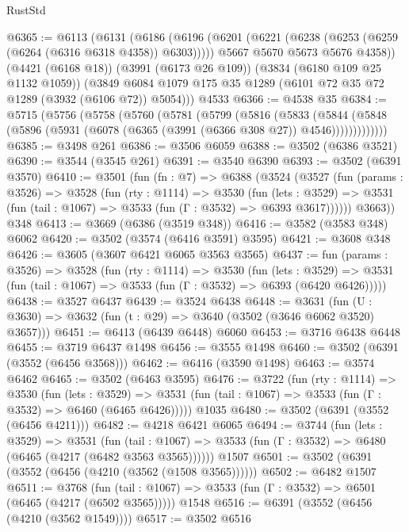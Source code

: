 \begin{lexlean}{RustStd}
\begin{coremodule}
@6365 := @6113
    (@6131
      (@6186
        (@6196
          (@6201 (@6221 (@6238 (@6253 (@6259 (@6264 (@6316 @6318 @4358)) @6303)))))
          @5667
          @5670
          @5673
          @5676
          @4358))
      (@4421 (@6168 @18))
      (@3991 (@6173 @26 @109))
      (@3834 (@6180 @109 @25 @1132 @1059))
      (@3849 @6084 @1079 @175 @35 @1289 (@6101 @72 @35 @72 @1289 (@3932 (@6106 @72)) @5054)))
    @4533
@6366 := @4538 @35
@6384 := @5715
    (@5756
      (@5758
        (@5760
          (@5781
            (@5799
              (@5816
                (@5833
                  (@5844
                    (@5848 (@5896 (@5931 (@6078 (@6365 (@3991 (@6366 @308 @27)) @4546)))))))))))))
@6385 := @3498 @261
@6386 := @3506 @6059
@6388 := @3502 (@6386 @3521)
@6390 := @3544 (@3545 @261)
@6391 := @3540 @6390
@6393 := @3502 (@6391 @3570)
@6410 := @3501
    (fun (fn : @7) =>
    @6388
      (@3524
        (@3527
          (fun (params : @3526) =>
          @3528
            (fun (rty : @1114) =>
            @3530
              (fun (lets : @3529) =>
              @3531 (fun (tail : @1067) => @3533 (fun (Γ : @3532) => @6393 @3617))))))
        @3663))
    @348
@6413 := @3669 (@6386 (@3519 @348))
@6416 := @3582 (@3583 @348) @6062
@6420 := @3502 (@3574 (@6416 @3591) @3595)
@6421 := @3608 @348
@6426 := @3605 (@3607 @6421 @6065 @3563 @3565)
@6437 := fun (params : @3526) =>
  @3528
    (fun (rty : @1114) =>
    @3530
      (fun (lets : @3529) =>
      @3531 (fun (tail : @1067) => @3533 (fun (Γ : @3532) => @6393 (@6420 @6426)))))
@6438 := @3527 @6437
@6439 := @3524 @6438
@6448 := @3631 (fun (U : @3630) => @3632 (fun (t : @29) => @3640 (@3502 (@3646 @6062 @3520) @3657)))
@6451 := @6413 (@6439 @6448) @6060
@6453 := @3716 @6438 @6448
@6455 := @3719 @6437 @1498
@6456 := @3555 @1498
@6460 := @3502 (@6391 (@3552 (@6456 @3568)))
@6462 := @6416 (@3590 @1498)
@6463 := @3574 @6462
@6465 := @3502 (@6463 @3595)
@6476 := @3722
    (fun (rty : @1114) =>
    @3530
      (fun (lets : @3529) =>
      @3531 (fun (tail : @1067) => @3533 (fun (Γ : @3532) => @6460 (@6465 @6426)))))
    @1035
@6480 := @3502 (@6391 (@3552 (@6456 @4211)))
@6482 := @4218 @6421 @6065
@6494 := @3744
    (fun (lets : @3529) =>
    @3531
      (fun (tail : @1067) => @3533 (fun (Γ : @3532) => @6480 (@6465 (@4217 (@6482 @3563 @3565))))))
    @1507
@6501 := @3502 (@6391 (@3552 (@6456 (@4210 (@3562 (@1508 @3565))))))
@6502 := @6482 @1507
@6511 := @3768
    (fun (tail : @1067) => @3533 (fun (Γ : @3532) => @6501 (@6465 (@4217 (@6502 @3565)))))
    @1548
@6516 := @6391 (@3552 (@6456 (@4210 (@3562 @1549))))
@6517 := @3502 @6516

\end{coremodule}
\end{lexlean}
